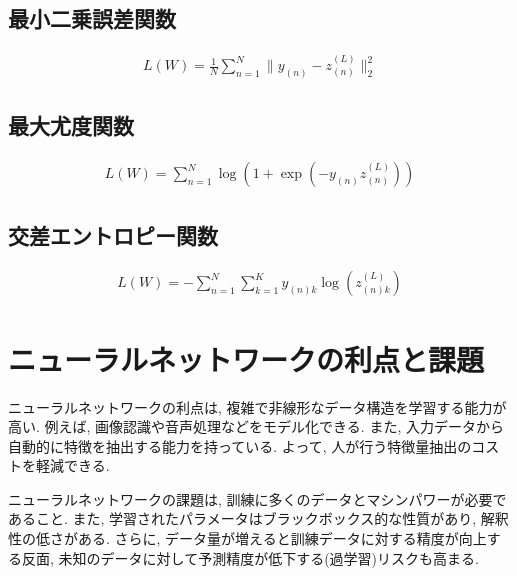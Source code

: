 \documentclass[dvipdfmx, 10pt]{jsarticle}
\begin{document}
\begin{oframed}
    
\subsection*{最小二乗誤差関数}
\begin{align*}
    L(W) = \frac{1}{N} \sum_{n=1}^N \| y_{(n)} - z^{(L)}_{(n)} \|_2^2
\end{align*}

\subsection*{最大尤度関数}
\begin{align*}
    L(W) = \sum_{n=1}^N \log(1 + \exp(-y_{(n)} z^{(L)}_{(n)}))
\end{align*}

\subsection*{交差エントロピー関数}
\begin{align*}
    L(W) = -\sum_{n=1}^N \sum_{k=1}^K y_{(n)k} \log(z^{(L)}_{(n)k})
\end{align*}
\end{oframed}

\section*{ニューラルネットワークの利点と課題}
ニューラルネットワークの利点は, 複雑で非線形なデータ構造を学習する能力が高い. 例えば, 画像認識や音声処理などをモデル化できる. 
また, 入力データから自動的に特徴を抽出する能力を持っている. よって, 人が行う特徴量抽出のコストを軽減できる. 

ニューラルネットワークの課題は, 訓練に多くのデータとマシンパワーが必要であること. 
また, 学習されたパラメータはブラックボックス的な性質があり, 解釈性の低さがある. 
さらに, データ量が増えると訓練データに対する精度が向上する反面, 未知のデータに対して予測精度が低下する(過学習)リスクも高まる. 
\end{document}
